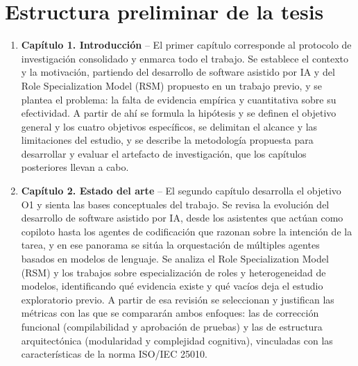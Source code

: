 \section{Estructura preliminar de la tesis}
\label{sec:estructura-tesis}


\begin{enumerate}
  \item \textbf{Capítulo 1. Introducción} --
    El primer capítulo corresponde al protocolo de investigación consolidado y enmarca todo el trabajo. Se establece el contexto y la motivación, partiendo del desarrollo de software asistido por IA y del Role Specialization Model (RSM) propuesto en un trabajo previo, y se plantea el problema: la falta de evidencia empírica y cuantitativa sobre su efectividad. A partir de ahí se formula la hipótesis y se definen el objetivo general y los cuatro objetivos específicos, se delimitan el alcance y las limitaciones del estudio, y se describe la metodología propuesta para desarrollar y evaluar el artefacto de investigación, que los capítulos posteriores llevan a cabo.

  \item \textbf{Capítulo 2. Estado del arte} --
    El segundo capítulo desarrolla el objetivo O1 y sienta las bases conceptuales del trabajo. Se revisa la evolución del desarrollo de software asistido por IA, desde los asistentes que actúan como copiloto hasta los agentes de codificación que razonan sobre la intención de la tarea, y en ese panorama se sitúa la orquestación de múltiples agentes basados en modelos de lenguaje. Se analiza el Role Specialization Model (RSM) y los trabajos sobre especialización de roles y heterogeneidad de modelos, identificando qué evidencia existe y qué vacíos deja el estudio exploratorio previo. A partir de esa revisión se seleccionan y justifican las métricas con las que se compararán ambos enfoques: las de corrección funcional (compilabilidad y aprobación de pruebas) y las de estructura arquitectónica (modularidad y complejidad cognitiva), vinculadas con las características de la norma ISO/IEC 25010.


\end{enumerate}
